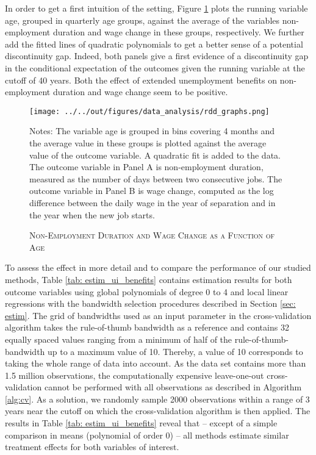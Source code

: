 In order to get a first intuition of the setting, Figure \ref{fig: estim_ui_benefits} plots the running variable age, grouped in quarterly age groups, against the average of the variables non-employment duration and wage change in these groups, respectively. We further add the fitted lines of quadratic polynomials to get a better sense of a potential discontinuity gap. Indeed, both panels give a first evidence of a discontinuity gap in the conditional expectation of the outcomes given the running variable at the cutoff of 40 years. Both the effect of extended unemployment benefits on non-employment duration and wage change seem to be positive.

\begin{figure}[H]
	\centering
	\texttt{[image: ../../out/figures/data\_analysis/rdd\_graphs.png]}
	\caption{\textsc{Non-Employment Duration and Wage Change as a Function of Age}}
	\label{fig: estim_ui_benefits}
	\medskip
	\justify
	\footnotesize{Notes: The variable age is grouped in bins covering 4 months and the average value in these groups is plotted against the average value of the outcome variable. A quadratic fit is added to the data. The outcome variable in Panel A is non-employment duration, measured as the number of days between two consecutive jobs. The outcome variable in Panel B is wage change, computed as the log difference between the daily wage in the year of separation and in the year when the new job starts.}
\end{figure}

To assess the effect in more detail and to compare the performance of our studied methods, Table \ref{tab: estim_ui_benefits} contains estimation results for both outcome variables using global polynomials of degree 0 to 4 and local linear regressions with the bandwidth selection procedures described in Section \ref{sec: estim}. The grid of bandwidths used as an input parameter in the cross-validation algorithm takes the rule-of-thumb bandwidth as a reference and contains 32 equally spaced values ranging from a minimum of half of the rule-of-thumb-bandwidth up to a maximum value of 10. Thereby, a value of 10 corresponds to taking the whole range of data into account. As the data set contains more than 1.5 million observations, the computationally expensive leave-one-out cross-validation cannot be performed with all observations as described in Algorithm \ref{alg:cv}. As a solution, we randomly sample 2000 observations within a range of 3 years near the cutoff on which the cross-validation algorithm is then applied. The results in Table \ref{tab: estim_ui_benefits} reveal that -- except of a simple comparison in means (polynomial of order 0) -- all methods estimate similar treatment effects for both variables of interest.


